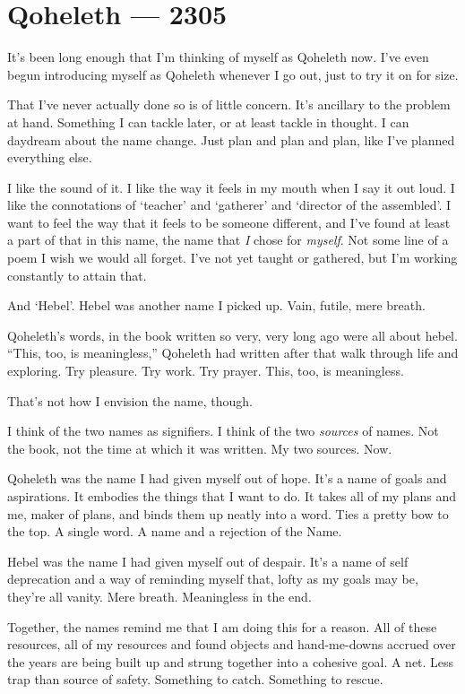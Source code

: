 \hypertarget{qoheleth-2305}{%
\chapter*{Qoheleth — 2305}\label{qoheleth-2305}}

It's been long enough that I'm thinking of myself as Qoheleth now. I've even begun introducing myself as Qoheleth whenever I go out, just to try it on for size.

That I've never actually done so is of little concern. It's ancillary to the problem at hand. Something I can tackle later, or at least tackle in thought. I can daydream about the name change. Just plan and plan and plan, like I've planned everything else.

I like the sound of it. I like the way it feels in my mouth when I say it out loud. I like the connotations of `teacher' and `gatherer' and `director of the assembled'. I want to feel the way that it feels to be someone different, and I've found at least a part of that in this name, the name that \emph{I} chose for \emph{myself}. Not some line of a poem I wish we would all forget. I've not yet taught or gathered, but I'm working constantly to attain that.

And `Hebel'. Hebel was another name I picked up. Vain, futile, mere breath.

Qoheleth's words, in the book written so very, very long ago were all about hebel. ``This, too, is meaningless,'' Qoheleth had written after that walk through life and exploring. Try pleasure. Try work. Try prayer. This, too, is meaningless.

That's not how I envision the name, though.

I think of the two names as signifiers. I think of the two \emph{sources} of names. Not the book, not the time at which it was written. My two sources. Now.

Qoheleth was the name I had given myself out of hope. It's a name of goals and aspirations. It embodies the things that I want to do. It takes all of my plans and me, maker of plans, and binds them up neatly into a word. Ties a pretty bow to the top. A single word. A name and a rejection of the Name.

Hebel was the name I had given myself out of despair. It's a name of self deprecation and a way of reminding myself that, lofty as my goals may be, they're all vanity. Mere breath. Meaningless in the end.

Together, the names remind me that I am doing this for a reason. All of these resources, all of my resources and found objects and hand-me-downs accrued over the years are being built up and strung together into a cohesive goal. A net. Less trap than source of safety. Something to catch. Something to rescue.

